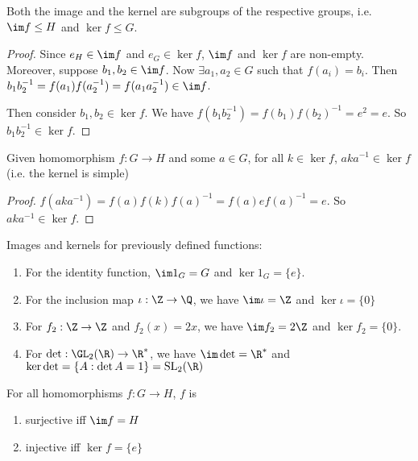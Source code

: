\documentclass[a4pape]{article}
\begin{document}
\begin{prop}
  Both the image and the kernel are subgroups of the respective groups, i.e. $\im f\leq H$ and $\ker f \leq G$.
\end{prop}

\begin{proof}
  Since $e_H\in \im f$ and $e_G\in \ker f$, $\im f$ and $\ker f$ are non-empty. Moreover, suppose $b_1, b_2\in \im f$. Now $\exists a_1, a_2 \in G$ such that $f(a_i) = b_i$. Then $b_1b_2^{-1} = f(a_1)f(a_2^{-1}) = f(a_1a_2^{-1})\in \im f$. 

  Then consider $b_1,b_2\in \ker f$. We have $f(b_1b_2^{-1}) = f(b_1)f(b_2)^{-1} = e^2 = e$. So $b_1b_2^{-1}\in \ker f$.
\end{proof}

\begin{prop}
  Given homomorphism $f:G\rightarrow H$ and some $a\in G$, for all $k\in \ker f$, $aka^{-1}\in\ker f$ (i.e. the kernel is simple)
\end{prop}

\begin{proof}
  $f(aka^{-1}) = f(a)f(k)f(a)^{-1} = f(a)ef(a)^{-1} = e$. So $aka^{-1}\in \ker f$.
\end{proof}

\begin{eg}
  Images and kernels for previously defined functions:
  \begin{enumerate}
    \item For the identity function, $\im 1_G = G$ and $\ker 1_G = \{e\}$.
    \item For the inclusion map $\iota: \Z\rightarrow\Q$, we have $\im \iota = \Z$ and $\ker \iota = \{0\}$
    \item For $f_2:\Z\rightarrow\Z$ and $f_2(x) = 2x$, we have $\im f_2 = 2\Z$ and $\ker f_2 = \{0\}$.
    \item For $\det: \GL_2(\R) \rightarrow \R^*$, we have $\im \det = \R^*$ and $\ker \det = \{A:\det A = 1\} = \mathrm{SL}_2(\R)$
  \end{enumerate}
\end{eg}
\begin{prop}
  For all homomorphisms $f:G\rightarrow H$, $f$ is
  \begin{enumerate}
    \item surjective iff $\im f = H$
    \item injective iff $\ker f = \{e\}$
  \end{enumerate}
\end{prop}
\end{document}
